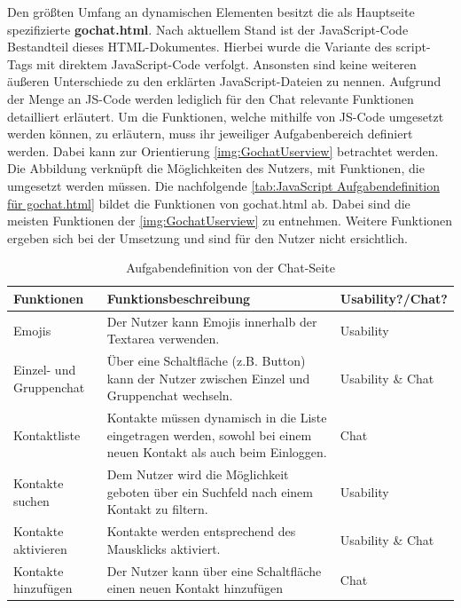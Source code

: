 \documentclass[a4paper,titlepage,halfparskip,12pt]{scrreprt}
\begin{document}
\begin{onehalfspacing}
Den größten Umfang an dynamischen Elementen besitzt die als Hauptseite spezifizierte \textbf{gochat.html}. Nach aktuellem Stand ist der JavaScript-Code Bestandteil dieses \ac{HTML}-Dokumentes. Hierbei wurde die Variante des script-Tags mit direktem JavaScript-Code verfolgt. Ansonsten sind keine weiteren äußeren Unterschiede zu den erklärten JavaScript-Dateien zu nennen. Aufgrund der Menge an \ac{JS}-Code werden lediglich für den Chat relevante Funktionen detailliert erläutert. Um die Funktionen, welche mithilfe von JS-Code umgesetzt werden können, zu erläutern, muss ihr jeweiliger Aufgabenbereich definiert werden. Dabei kann zur Orientierung \autoref{img:GochatUserview} betrachtet werden. Die Abbildung verknüpft die Möglichkeiten des Nutzers, mit Funktionen, die umgesetzt werden müssen. Die nachfolgende \autoref{tab:JavaScript Aufgabendefinition für gochat.html} bildet die Funktionen von gochat.html ab. Dabei sind die meisten Funktionen der \autoref{img:GochatUserview} zu entnehmen. Weitere Funktionen ergeben sich bei der Umsetzung und sind für den Nutzer nicht ersichtlich.
\begin{table}[h]
	\centering
	\caption{Aufgabendefinition von der Chat-Seite}
	\begin{tabular}{|p{2.5cm}|p{8.8cm}|p{3.5cm}|}
		\hline
		\textbf{Funktionen} & \textbf{Funktionsbeschreibung} & \textbf{Usability?/Chat?}  \\
		\hline
		Emojis & Der Nutzer kann Emojis innerhalb der Textarea verwenden. & Usability \\
		\hline
		Einzel- und Gruppenchat & Über eine Schaltfläche (z.B. Button) kann der Nutzer zwischen Einzel und Gruppenchat wechseln. & Usability \linebreak \& Chat\\
		\hline
		Kontaktliste & Kontakte müssen dynamisch in die Liste eingetragen werden, sowohl bei einem neuen Kontakt als auch beim Einloggen. & Chat\\
		\hline
		Kontakte \linebreak suchen & Dem Nutzer wird die Möglichkeit geboten über ein Suchfeld nach einem Kontakt zu filtern. & Usability\\
		\hline
		Kontakte \linebreak aktivieren & Kontakte werden entsprechend des Mausklicks aktiviert. & Usability \linebreak \& Chat\\
		\hline
		Kontakte \linebreak hinzufügen & Der Nutzer kann über eine Schaltfläche einen neuen Kontakt hinzufügen & Chat\\

\end{tabular}
\end{table}
\end{onehalfspacing}
\end{document}
